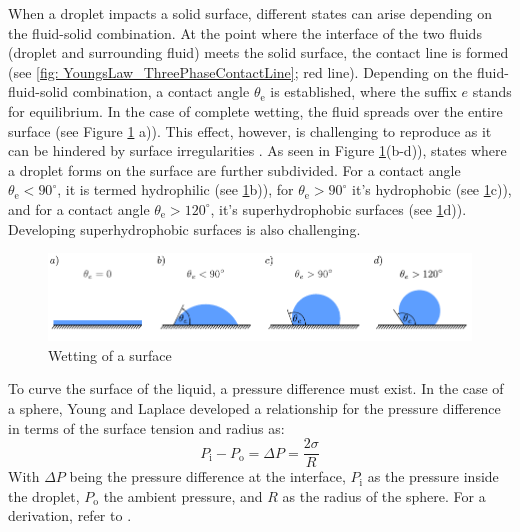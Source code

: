 When a droplet impacts a solid surface, different states can arise depending on the fluid-solid combination. At the point where the interface of the two fluids (droplet and surrounding fluid) meets the solid surface, the contact line is formed (see \ref{fig: YoungsLaw_ThreePhaseContactLine}; red line). Depending on the fluid-fluid-solid combination, a contact angle $\theta_{\mathrm{e}}$ is established, where the suffix $e$ stands for equilibrium. In the case of complete wetting, the fluid spreads over the entire surface (see Figure \ref{fig: WettingTheory_WettingOfSurface} a)). This effect, however, is challenging to reproduce as it can be hindered by surface irregularities . As seen in Figure \ref{fig: WettingTheory_WettingOfSurface}(b-d)), states where a droplet forms on the surface are further subdivided. For a contact angle $\theta_{\mathrm{e}}<90^{\circ}$, it is termed hydrophilic (see \ref{fig: WettingTheory_WettingOfSurface}b)), for $\theta_{\mathrm{e}}>90^{\circ}$ it's hydrophobic (see \ref{fig: WettingTheory_WettingOfSurface}c)), and for a contact angle $\theta_{\mathrm{e}}>120^{\circ}$, it's superhydrophobic surfaces (see \ref{fig: WettingTheory_WettingOfSurface}d)). Developing superhydrophobic surfaces is also challenging.
\begin{figure}[h]
    \centering
    \includegraphics[width=.95\textwidth]{Pictures/DropletsAndWetting.pdf}
    \caption{Wetting of a surface}
    \label{fig: WettingTheory_WettingOfSurface}
\end{figure}
To curve the surface of the liquid, a pressure difference must exist. In the case of a sphere, Young and Laplace developed a relationship for the pressure difference in terms of the surface tension and radius as:
\begin{equation}
\label{eq: YoungLaplaceEQ}
    P_{\mathrm{i}} - P_{\mathrm{o}} = \Delta P =  \frac{2\sigma}{R}
\end{equation}
With $\Delta P$ being the pressure difference at the interface, $P_{\mathrm{i}}$ as the pressure inside the droplet, $P_{\mathrm{o}}$ the ambient pressure, and $R$ as the radius of the sphere. For a derivation, refer to \cite{buttPhysicsChemistryInterfaces}.


